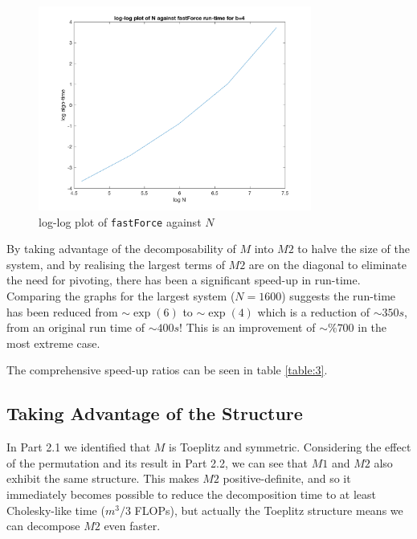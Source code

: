 \documentclass[paper=a4, fontsize=12pt]{scrartcl} %
\numberwithin{equation}{section}       %
\numberwithin{figure}{section}         %
\numberwithin{table}{section}          %
\begin{document}
\begin{figure}[h!]
  \centering
  \includegraphics[width=0.8\textwidth]{log-log_plot_fastForce.png}
  \caption{log-log plot of \texttt{fastForce} against $N$}
  \label{fig:fastForce}
\end{figure}

\noindent By taking advantage of the decomposability of $M$ into $M2$ to halve the size of the system, and by realising the largest terms of $M2$ are on the diagonal to eliminate the need for pivoting, there has been a significant speed-up in run-time. Comparing the graphs for the largest system ($N=1600$) suggests the run-time has been reduced from $\sim\exp(6) $  to $\sim\exp(4)$ which is a reduction of $\sim 350s$, from an original run time of $\sim 400s$! This is an improvement of $\sim \% 700 $ in the most extreme case. 

\noindent The comprehensive speed-up ratios can be seen in table \ref{table:3}. 

\subsection{Taking Advantage of the Structure}
In Part 2.1 we identified that $M$ is Toeplitz and symmetric. Considering the effect of the permutation and its result in Part 2.2, we can see that $M1$ and $M2$ also exhibit the same structure. This makes $M2$ positive-definite, and so it immediately becomes possible to reduce the decomposition time to at least Cholesky-like time ($m^3/3$ FLOPs), but actually the Toeplitz structure means we can decompose $M2$ even faster. \\
\end{document}
